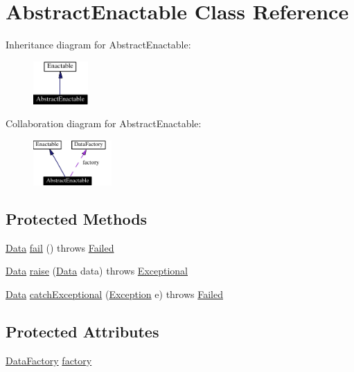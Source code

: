 \hypertarget{classAbstractEnactable}{
\section{Abstract\-Enactable  Class Reference}
\label{classAbstractEnactable}
}
Inheritance diagram for Abstract\-Enactable:\begin{figure}[H]
\begin{center}
\leavevmode
\includegraphics[width=59pt]{classAbstractEnactable__inherit__graph}
\end{center}
\end{figure}
Collaboration diagram for Abstract\-Enactable:\begin{figure}[H]
\begin{center}
\leavevmode
\includegraphics[width=85pt]{classAbstractEnactable__coll__graph}
\end{center}
\end{figure}
\subsection*{Protected Methods}
\begin{CompactItemize}
\item 
\hyperlink{interfaceData}{Data} \hyperlink{classAbstractEnactable_b0}{fail} () throws \hyperlink{classFailed}{Failed}
\item 
\hyperlink{interfaceData}{Data} \hyperlink{classAbstractEnactable_b1}{raise} (\hyperlink{interfaceData}{Data} data) throws \hyperlink{classExceptional}{Exceptional}
\item 
\hyperlink{interfaceData}{Data} \hyperlink{classAbstractEnactable_b2}{catch\-Exceptional} (\hyperlink{classException}{Exception} e) throws \hyperlink{classFailed}{Failed}
\end{CompactItemize}
\subsection*{Protected Attributes}
\begin{CompactItemize}
\item 
\hyperlink{interfaceDataFactory}{Data\-Factory} \hyperlink{classAbstractEnactable_n0}{factory}
\end{CompactItemize}



